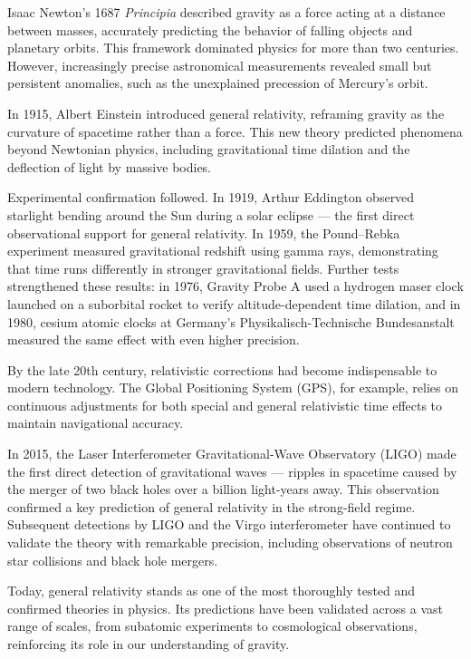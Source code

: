 \begin{historical}
Isaac Newton’s 1687 \textit{Principia} described gravity as a force acting at a distance between masses, accurately predicting the behavior of falling objects and planetary orbits. This framework dominated physics for more than two centuries. However, increasingly precise astronomical measurements revealed small but persistent anomalies, such as the unexplained precession of Mercury’s orbit.

In 1915, Albert Einstein introduced general relativity, reframing gravity as the curvature of spacetime rather than a force. This new theory predicted phenomena beyond Newtonian physics, including gravitational time dilation and the deflection of light by massive bodies.

Experimental confirmation followed. In 1919, Arthur Eddington observed starlight bending around the Sun during a solar eclipse — the first direct observational support for general relativity. In 1959, the Pound–Rebka experiment measured gravitational redshift using gamma rays, demonstrating that time runs differently in stronger gravitational fields. Further tests strengthened these results: in 1976, Gravity Probe A used a hydrogen maser clock launched on a suborbital rocket to verify altitude-dependent time dilation, and in 1980, cesium atomic clocks at Germany’s Physikalisch-Technische Bundesanstalt measured the same effect with even higher precision.

By the late 20th century, relativistic corrections had become indispensable to modern technology. The Global Positioning System (GPS), for example, relies on continuous adjustments for both special and general relativistic time effects to maintain navigational accuracy.

In 2015, the Laser Interferometer Gravitational-Wave Observatory (LIGO) made the first direct detection of gravitational waves — ripples in spacetime caused by the merger of two black holes over a billion light-years away. This observation confirmed a key prediction of general relativity in the strong-field regime. Subsequent detections by LIGO and the Virgo interferometer have continued to validate the theory with remarkable precision, including observations of neutron star collisions and black hole mergers.

Today, general relativity stands as one of the most thoroughly tested and confirmed theories in physics. Its predictions have been validated across a vast range of scales, from subatomic experiments to cosmological observations, reinforcing its role in our understanding of gravity.
\end{historical}
